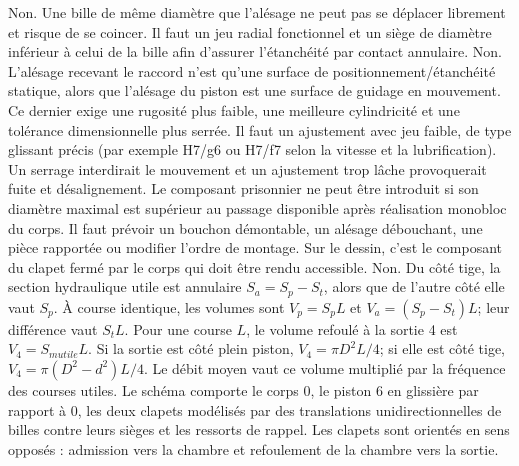 \begin{corrigebox}
Non. Une bille de même diamètre que l'alésage ne peut pas se déplacer librement et risque de se coincer. Il faut un jeu radial fonctionnel et un siège de diamètre inférieur à celui de la bille afin d'assurer l'étanchéité par contact annulaire.
Non. L'alésage recevant le raccord n'est qu'une surface de positionnement/étanchéité statique, alors que l'alésage du piston est une surface de guidage en mouvement. Ce dernier exige une rugosité plus faible, une meilleure cylindricité et une tolérance dimensionnelle plus serrée.
Il faut un ajustement avec jeu faible, de type glissant précis (par exemple H7/g6 ou H7/f7 selon la vitesse et la lubrification). Un serrage interdirait le mouvement et un ajustement trop lâche provoquerait fuite et désalignement.
Le composant prisonnier ne peut être introduit si son diamètre maximal est supérieur au passage disponible après réalisation monobloc du corps. Il faut prévoir un bouchon démontable, un alésage débouchant, une pièce rapportée ou modifier l'ordre de montage. Sur le dessin, c'est le composant du clapet fermé par le corps qui doit être rendu accessible.
Non. Du côté tige, la section hydraulique utile est annulaire $S_a=S_p-S_t$, alors que de l'autre côté elle vaut $S_p$. À course identique, les volumes sont $V_p=S_p L$ et $V_a=(S_p-S_t)L$; leur différence vaut $S_tL$.
Pour une course $L$, le volume refoulé à la sortie 4 est $V_4=S_{
m utile}L$. Si la sortie est côté plein piston, $V_4=\pi D^2L/4$; si elle est côté tige, $V_4=\pi(D^2-d^2)L/4$. Le débit moyen vaut ce volume multiplié par la fréquence des courses utiles.
Le schéma comporte le corps 0, le piston 6 en glissière par rapport à 0, les deux clapets modélisés par des translations unidirectionnelles de billes contre leurs sièges et les ressorts de rappel. Les clapets sont orientés en sens opposés : admission vers la chambre et refoulement de la chambre vers la sortie.
\end{corrigebox}
